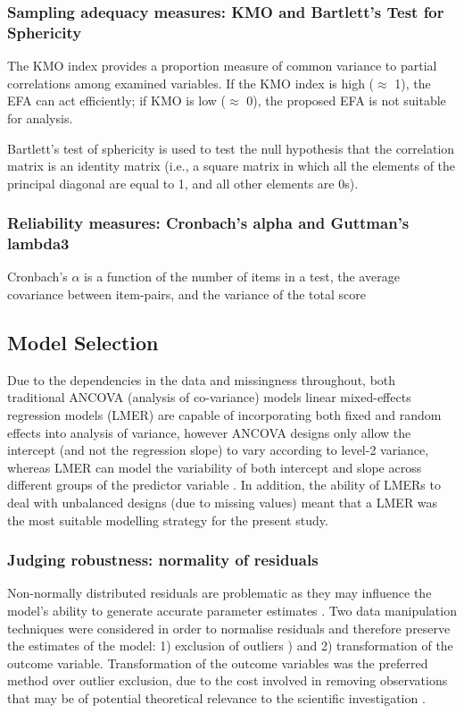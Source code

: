 \subsubsection{Sampling adequacy measures: KMO and Bartlett's Test for Sphericity \label{app8:samplingAdequacy}}

The KMO index provides a proportion measure of common variance to partial correlations among examined variables.  If the KMO index is high ($\approx$ 1), the EFA can act efficiently; if KMO is low ($\approx$ 0), the proposed EFA is not suitable for analysis.

Bartlett’s test of sphericity is used to test the null hypothesis that the correlation matrix is an identity matrix (i.e., a square matrix in which all the elements of the principal diagonal are equal to 1, and all other elements are 0s).

\subsubsection{Reliability measures: Cronbach's alpha and Guttman's lambda3\label{app8:reliabilityMeasures}}

Cronbach's $\alpha$ is a function of the number of items in a test, the average covariance between item-pairs, and the variance of the total score \citep{Tabachnick2007}



\subsection{Model Selection\label{app8:modelSelection}}
Due to the dependencies in the data and missingness throughout, both traditional ANCOVA (analysis of co-variance) models linear mixed-effects regression models (LMER) are capable of incorporating both fixed and random effects into analysis of variance, however ANCOVA designs only allow the intercept (and not the regression slope) to vary according to level-2 variance, whereas LMER can model the variability of both intercept and slope across different groups of the predictor variable \citep{Field2012}. In addition, the ability of LMERs to deal with unbalanced designs (due to missing values) meant that a LMER was the most suitable modelling strategy for the present study.

\subsubsection{Judging robustness: normality of residuals\label{app8:normality}}
Non-normally distributed residuals are problematic as they may influence the model's ability to generate accurate parameter estimates . Two data manipulation techniques were considered in order to normalise residuals and therefore preserve the estimates of the model: 1) exclusion of outliers \citep[according to Tukey's method; observations above and below 1.5x the Inter Quartile Range (IQR); see][]{Tukey1977}) and 2) transformation of the outcome variable.  Transformation of the outcome variables was the preferred method over outlier exclusion, due to the cost involved in removing observations that may be of potential theoretical relevance to the scientific investigation \citep{Rousseeuw2011}.

